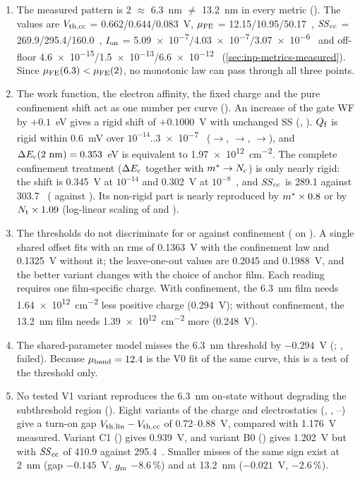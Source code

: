 \begin{enumerate}
  \item The measured pattern is 2 $\approx$ 6.3~nm $\neq$ 13.2~nm in every metric (\evDATA). The values are $V_{\mathrm{th,cc}}$ = 0.662/0.644/0.083~V, $\mu_{\mathrm{FE}}$ = 12.15/10.95/50.17~\cmVs, $\mathit{SS}_{\mathrm{cc}}$ = 269.9/295.4/160.0~\mVdec, $I_{\mathrm{on}}$ = \SI{5.09e-7}{}/\SI{4.03e-7}{}/\SI{3.07e-6}{}~\Aum{} and off-floor \SI{4.6e-15}{}/\SI{1.5e-13}{}/\SI{6.6e-12}{}~\Aum{} (\cref{sec:inp-metrics-measured}). Since $\mu_{\mathrm{FE}}(6.3) < \mu_{\mathrm{FE}}(2)$, no monotonic law can pass through all three points.
  \item The work function, the electron affinity, the fixed charge and the pure confinement shift act as one number per curve (\evNUM). An increase of the gate WF by $+0.1$~eV gives a rigid shift of $+0.1000$~V with unchanged SS (, ). $Q_{\mathrm{f}}$ is rigid within 0.6~mV over $10^{-14}$..\SI{3e-7}{}~\Aum{} ($\rightarrow$, $\rightarrow$, $\rightarrow$), and $\Delta E_{\mathrm{c}}(2~\mathrm{nm}) = 0.353$~eV is equivalent to \SI{1.97e12}{cm^{-2}}. The complete confinement treatment ($\Delta E_{\mathrm{c}}$ together with $m^{*}\rightarrow N_{\mathrm{c}}$) is only nearly rigid: the shift is 0.345~V at $10^{-14}$ and 0.302~V at $10^{-8}$~\Aum, and $\mathit{SS}_{\mathrm{cc}}$ is 289.1 against 303.7~\mVdec{} ( against ). Its non-rigid part is nearly reproduced by $m^{*}\times0.8$ or by $N_{\mathrm{t}}\times1.09$ (log-linear scaling of  and ).
  \item The thresholds do not discriminate for or against confinement (\evNUM{} on \evDATA). A single shared offset fits with an rms of 0.1363~V with the confinement law and 0.1325~V without it; the leave-one-out values are 0.2045 and 0.1988~V, and the better variant changes with the choice of anchor film. Each reading requires one film-specific charge. With confinement, the 6.3~nm film needs \SI{1.64e12}{cm^{-2}} less positive charge (0.294~V); without confinement, the 13.2~nm film needs \SI{1.39e12}{cm^{-2}} more (0.248~V).
  \item The shared-parameter model misses the 6.3~nm threshold by $-0.294$~V (; \evOOS, failed). Because $\mu_{\mathrm{band}} = 12.4$ is the V0 fit of the same curve, this is a test of the threshold only.
  \item No tested V1 variant reproduces the 6.3~nm on-state without degrading the subthreshold region (\evNUM). Eight variants of the charge and electrostatics (, , --) give a turn-on gap $V_{\mathrm{th,lin}}-V_{\mathrm{th,cc}}$ of 0.72--0.88~V, compared with 1.176~V measured. Variant C1 () gives 0.939~V, and variant B0 () gives 1.202~V but with $\mathit{SS}_{\mathrm{cc}}$ of 410.9 against 295.4~\mVdec. Smaller misses of the same sign exist at 2~nm (gap $-0.145$~V, $g_{\mathrm{m}}$ $-8.6$\,\%) and at 13.2~nm ($-0.021$~V, $-2.6$\,\%).

\end{enumerate}
